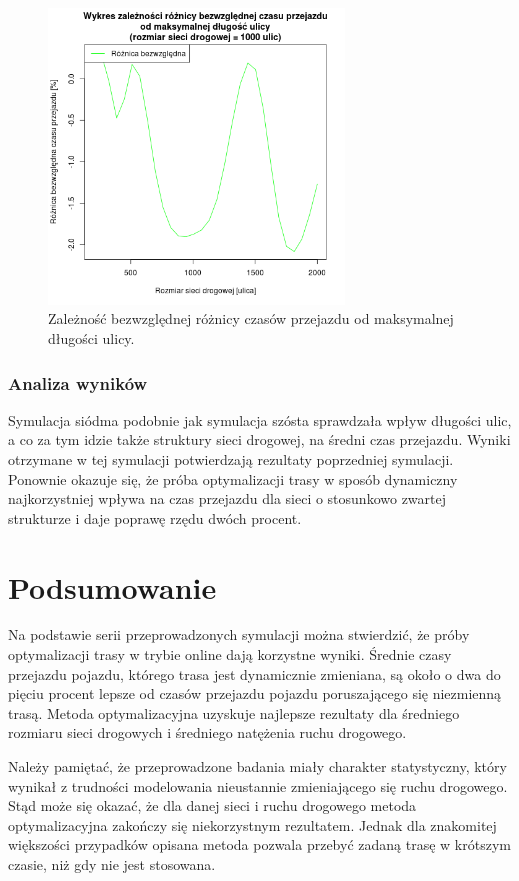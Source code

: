 \documentclass[11pt,a4paper]{article}
\begin{document}
\begin{figure}[H]
	\centering
		\includegraphics[width=0.7\textwidth]{../images/simulation7_diff}
	\caption{Zależność bezwzględnej różnicy czasów przejazdu od maksymalnej długości ulicy.}
\end{figure}

\subsubsection{Analiza wyników}

Symulacja siódma podobnie jak symulacja szósta sprawdzała wpływ długości ulic, a co za tym idzie także struktury sieci drogowej, na średni czas przejazdu. Wyniki otrzymane w tej symulacji potwierdzają rezultaty poprzedniej symulacji. Ponownie okazuje się, że próba optymalizacji trasy w sposób dynamiczny najkorzystniej wpływa na czas przejazdu dla sieci o stosunkowo zwartej strukturze i daje poprawę rzędu dwóch procent.

\section{Podsumowanie}

Na podstawie serii przeprowadzonych symulacji można stwierdzić, że próby optymalizacji trasy w trybie online dają korzystne wyniki. Średnie czasy przejazdu pojazdu, którego trasa jest dynamicznie zmieniana, są około o dwa do pięciu procent lepsze od czasów przejazdu pojazdu poruszającego się niezmienną trasą. Metoda optymalizacyjna uzyskuje najlepsze rezultaty dla średniego rozmiaru sieci drogowych i średniego natężenia ruchu drogowego.

Należy pamiętać, że przeprowadzone badania miały charakter statystyczny, który wynikał z trudności modelowania nieustannie zmieniającego się ruchu drogowego. Stąd może się okazać, że dla danej sieci i ruchu drogowego metoda optymalizacyjna zakończy się niekorzystnym rezultatem. Jednak dla znakomitej większości przypadków opisana metoda pozwala przebyć zadaną trasę w krótszym czasie, niż gdy nie jest stosowana.
\end{document}
